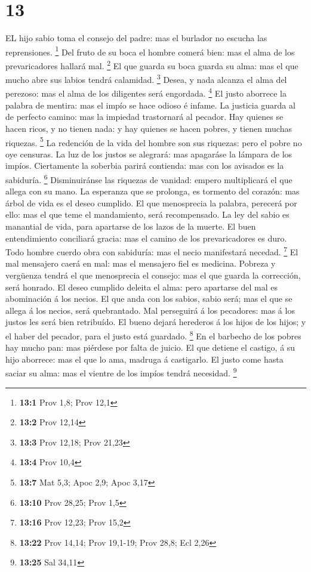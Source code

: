 \hypertarget{section-12}{%
\section{13}\label{section-12}}

 EL hijo sabio toma el consejo del padre: mas el burlador no
escucha las reprensiones. \footnote{\textbf{13:1} Prov 1,8; Prov 12,1}
 Del fruto de su boca el hombre comerá bien: mas el alma de
los prevaricadores hallará mal. \footnote{\textbf{13:2} Prov 12,14}
 El que guarda su boca guarda su alma: mas el que mucho abre
sus labios tendrá calamidad. \footnote{\textbf{13:3} Prov 12,18; Prov
  21,23}  Desea, y nada alcanza el alma del perezoso: mas el
alma de los diligentes será engordada. \footnote{\textbf{13:4} Prov 10,4}
 El justo aborrece la palabra de mentira: mas el impío se
hace odioso é infame.  La justicia guarda al de perfecto
camino: mas la impiedad trastornará al pecador.  Hay quienes
se hacen ricos, y no tienen nada: y hay quienes se hacen pobres, y
tienen muchas riquezas. \footnote{\textbf{13:7} Mat 5,3; Apoc 2,9; Apoc
  3,17}  La redención de la vida del hombre son sus
riquezas: pero el pobre no oye censuras.  La luz de los
justos se alegrará: mas apagaráse la lámpara de los impíos.
 Ciertamente la soberbia parirá contienda: mas con los
avisados es la sabiduría. \footnote{\textbf{13:10} Prov 28,25; Prov 1,5}
 Disminuiránse las riquezas de vanidad: empero multiplicará
el que allega con su mano.  La esperanza que se prolonga,
es tormento del corazón: mas árbol de vida es el deseo cumplido.
 El que menosprecia la palabra, perecerá por ello: mas el
que teme el mandamiento, será recompensado.  La ley del
sabio es manantial de vida, para apartarse de los lazos de la muerte.
 El buen entendimiento conciliará gracia: mas el camino de
los prevaricadores es duro.  Todo hombre cuerdo obra con
sabiduría: mas el necio manifestará necedad. \footnote{\textbf{13:16}
  Prov 12,23; Prov 15,2}  El mal mensajero caerá en mal:
mas el mensajero fiel es medicina.  Pobreza y vergüenza
tendrá el que menosprecia el consejo: mas el que guarda la corrección,
será honrado.  El deseo cumplido deleita el alma: pero
apartarse del mal es abominación á los necios.  El que anda
con los sabios, sabio será; mas el que se allega á los necios, será
quebrantado.  Mal perseguirá á los pecadores: mas á los
justos les será bien retribuído.  El bueno dejará herederos
á los hijos de los hijos; y el haber del pecador, para el justo está
guardado. \footnote{\textbf{13:22} Prov 14,14; Prov 19,1-19; Prov 28,8;
  Ecl 2,26}  En el barbecho de los pobres hay mucho pan:
mas piérdese por falta de juicio.  El que detiene el
castigo, á su hijo aborrece: mas el que lo ama, madruga á castigarlo.
 El justo come hasta saciar su alma: mas el vientre de los
impíos tendrá necesidad. \footnote{\textbf{13:25} Sal 34,11}

